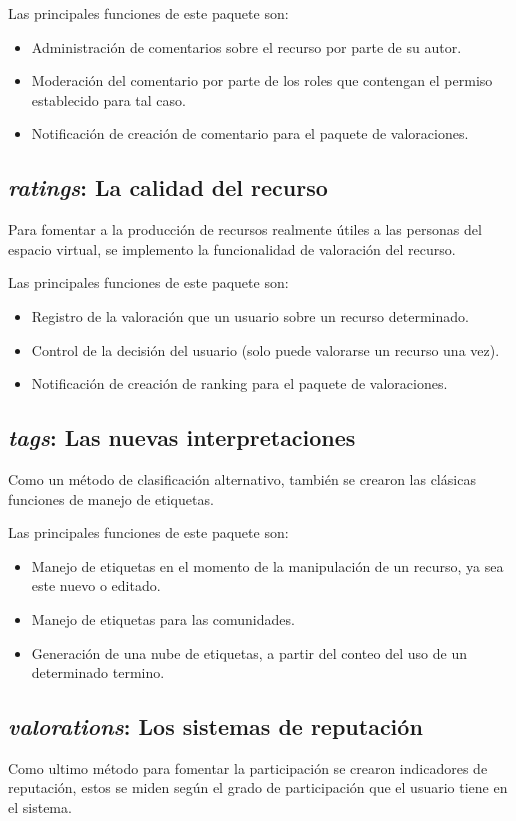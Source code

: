 Las principales funciones de este paquete son:

\begin{itemize}
\item Administración de comentarios sobre el recurso por parte de su autor.
\item Moderación del comentario por parte de los roles que contengan el permiso
establecido para tal caso.
\item Notificación de creación de comentario para el paquete de valoraciones.
\end{itemize}

\subsection{\emph{ratings}: La calidad del recurso}
Para fomentar a la producción de recursos realmente útiles a las personas del
espacio virtual, se implemento la funcionalidad de valoración del recurso.

Las principales funciones de este paquete son:

\begin{itemize}
\item Registro de la valoración que un usuario sobre un recurso determinado.
\item Control de la decisión del usuario (solo puede valorarse un recurso una
vez).
\item Notificación de creación de ranking para el paquete de valoraciones.
\end{itemize}

\subsection{\emph{tags}: Las nuevas interpretaciones}
Como un método de clasificación alternativo, también se crearon las clásicas
funciones de manejo de etiquetas.

Las principales funciones de este paquete son:

\begin{itemize}
\item Manejo de etiquetas en el momento de la manipulación de un recurso, ya sea
este nuevo o editado.
\item Manejo de etiquetas para las comunidades.
\item Generación de una nube de etiquetas, a partir del conteo del uso de un
determinado termino.
\end{itemize}

\subsection{\emph{valorations}: Los sistemas de reputación}
Como ultimo método para fomentar la participación se crearon indicadores de
reputación, estos se miden según el grado de participación que el usuario tiene
en el sistema.

